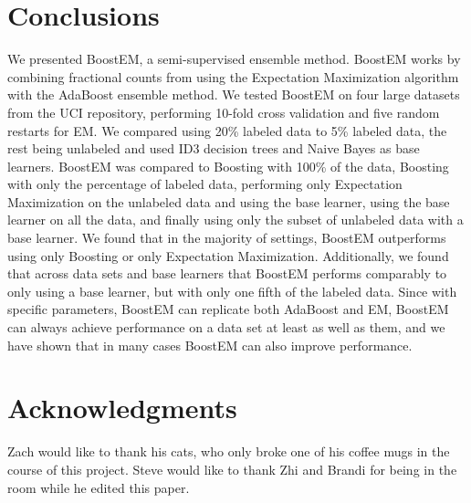\documentclass{sig-alternate}
\begin{document}
\section{Conclusions}
We presented BoostEM, a semi-supervised ensemble method.  BoostEM works by combining fractional counts from using the Expectation Maximization algorithm with the AdaBoost ensemble method.  We tested BoostEM on four large datasets from the UCI repository, performing 10-fold cross validation and five random restarts for EM.  We compared using 20\% labeled data to 5\% labeled data, the rest being unlabeled and used ID3 decision trees and Naive Bayes as base learners.  BoostEM was compared to Boosting with 100\% of the data, Boosting with only the percentage of labeled data, performing only Expectation Maximization on the unlabeled data and using the base learner, using the base learner on all the data, and finally using only the subset of unlabeled data with a base learner. We found that in the majority of settings, BoostEM outperforms using only Boosting or only Expectation Maximization. Additionally, we found that across data sets and base learners that BoostEM performs comparably to only using a base learner, but with only one fifth of the labeled data. Since with specific parameters, BoostEM can replicate both AdaBoost and EM, BoostEM can always achieve performance on a data set at least as well as them, and we have shown that in many cases BoostEM can also improve performance.

\section{Acknowledgments}
Zach would like to thank his cats, who only broke one of his coffee mugs in the course of this project. Steve would like to thank Zhi and Brandi for being in the room while he edited this paper.


\end{document}
